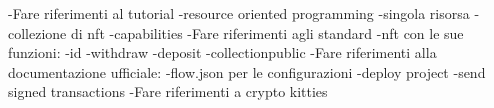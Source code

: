 -Fare riferimenti al tutorial
    -resource oriented programming
        -singola risorsa
        -collezione di nft
    -capabilities
-Fare riferimenti agli standard
    -nft con le sue funzioni:
        -id
        -withdraw
        -deposit
        -collectionpublic
-Fare riferimenti alla documentazione ufficiale:
    -flow.json per le configurazioni
    -deploy project
    -send signed transactions
-Fare riferimenti a crypto kitties